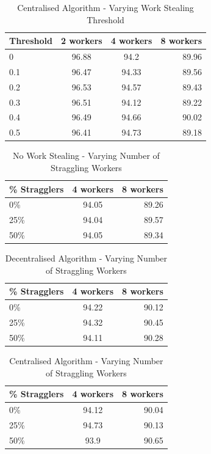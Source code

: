 \documentclass[12pt]{article}
\begin{document}
\begin{table}[htb]
\centering
\caption{Centralised Algorithm - Varying Work Stealing Threshold}
\begin{tabular}{l | c | c | r}
Threshold & 2 workers & 4 workers & 8 workers \\ \hline
0                 & 96.88     & 94.2      & 89.96     \\ \hline
0.1               & 96.47     & 94.33     & 89.56     \\ \hline
0.2               & 96.53     & 94.57     & 89.43     \\ \hline
0.3               & 96.51     & 94.12     & 89.22     \\ \hline
0.4               & 96.49     & 94.66     & 90.02     \\ \hline
0.5               & 96.41     & 94.73     & 89.18
\end{tabular}
\end{table}

\begin{table}[htb]
\centering
\caption{No Work Stealing - Varying Number of Straggling Workers}
\begin{tabular}{l | c | r}
\% Stragglers & 4 workers & 8 workers \\ \hline
0\%               & 94.05     & 89.26     \\ \hline
25\%             & 94.04     & 89.57     \\ \hline
50\%             & 94.05     & 89.34
\end{tabular}
\end{table}

\begin{table}[htb]
\centering
\caption{Decentralised Algorithm - Varying Number of Straggling Workers}
\begin{tabular}{l | c | r}
\% Stragglers & 4 workers & 8 workers \\ \hline
0\%               & 94.22     & 90.12     \\ \hline
25\%              & 94.32     & 90.45     \\ \hline
50\%              & 94.11     & 90.28
\end{tabular}
\end{table}

\begin{table}[htb]
\centering
\caption{Centralised Algorithm - Varying Number of Straggling Workers}
\begin{tabular}{l | c | r}
\% Stragglers & 4 workers & 8 workers \\ \hline
0\%               & 94.12     & 90.04     \\ \hline
25\%              & 94.73     & 90.13     \\ \hline
50\%              & 93.9      & 90.65
\end{tabular}
\end{table}
\end{document}
